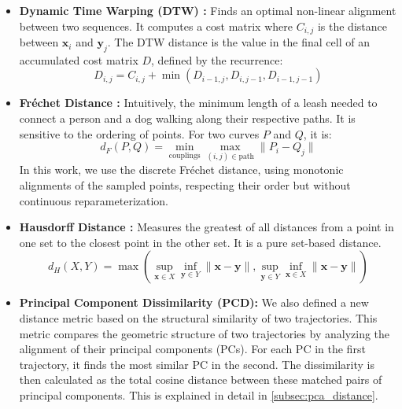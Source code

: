 \documentclass[a4paper,12pt]{article}
\begin{document}
\begin{itemize}
    \item \textbf{Dynamic Time Warping (DTW) \cite{SalvadorChan2007}:} Finds an optimal non-linear alignment between two sequences. It computes a cost matrix where $C_{i,j}$ is the distance between $\mathbf{x}_i$ and $\mathbf{y}_j$. The DTW distance is the value in the final cell of an accumulated cost matrix $D$, defined by the recurrence:
    \begin{equation}
        D_{i,j} = C_{i,j} + \min(D_{i-1, j}, D_{i, j-1}, D_{i-1, j-1})
    \end{equation}
    \item \textbf{Fréchet Distance \cite{Denaxas2023} \cite{EiterMannila1994}:} Intuitively, the minimum length of a leash needed to connect a person and a dog walking along their respective paths. It is sensitive to the ordering of points. For two curves $P$ and $Q$, it is:
        \begin{equation}
            d_F(P, Q) = \min_{\text{couplings}} \max_{(i, j) \in \text{path}} \| P_i - Q_j \|
        \end{equation}
        In this work, we use the discrete Fréchet distance, using monotonic alignments of the sampled points, respecting their order but without continuous reparameterization.
    \item \textbf{Hausdorff Distance \cite{SciPyDirectedHausdorff}:} Measures the greatest of all distances from a point in one set to the closest point in the other set. It is a pure set-based distance.
    \begin{equation}
        d_H(X, Y) = \max \left( \sup_{\mathbf{x} \in X} \inf_{\mathbf{y} \in Y} \|\mathbf{x}-\mathbf{y}\|, \sup_{\mathbf{y} \in Y} \inf_{\mathbf{x} \in X} \|\mathbf{x}-\mathbf{y}\| \right)
    \end{equation}
    \item \textbf{Principal Component Dissimilarity (PCD):} We also defined a new distance metric based on the structural similarity of two trajectories. This metric compares the geometric structure of two trajectories by analyzing the alignment of their principal components (PCs). For each PC in the first trajectory, it finds the most similar PC in the second. The dissimilarity is then calculated as the total cosine distance between these matched pairs of principal components. This is explained in detail in \ref{subsec:pca_distance}.



\end{itemize}
\end{document}
